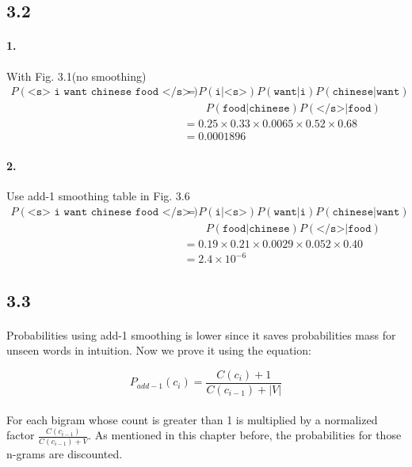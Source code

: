 \documentclass{article}
\begin{document}
\subsection*{3.2}
\paragraph{1.}
With Fig. 3.1(no smoothing)
\begin{align*}
    P(\texttt{<s> i want chinese food </s>})
     & = P(\texttt{i|<s>}) P(\texttt{want|i}) P(\texttt{chinese|want}) \\
     & \qquad P(\texttt{food|chinese}) P(\texttt{</s>|food})           \\
     & = 0.25 \times 0.33 \times 0.0065 \times 0.52 \times 0.68        \\
     & = 0.0001896
\end{align*}

\paragraph{2.}
Use add-1 smoothing table in Fig. 3.6
\begin{align*}
    P(\texttt{<s> i want chinese food </s>})
     & = P(\texttt{i|<s>}) P(\texttt{want|i})P(\texttt{chinese|want}) \\
     & \qquad P(\texttt{food|chinese}) P(\texttt{</s>|food})          \\
     & = 0.19 \times 0.21 \times 0.0029 \times 0.052 \times 0.40      \\
     & = 2.4 \times 10^{-6}
\end{align*}

\subsection*{3.3}
\paragraph{}
Probabilities using add-1 smoothing is lower since it saves probabilities
mass for unseen words in intuition. Now we prove it using the equation:

$$P_{add-1}(c_i) = \displaystyle\frac{C(c_i) + 1}{C(c_{i-1}) + |V|}$$

\paragraph{}
For each bigram whose count is greater than 1
is multiplied by a normalized factor $\displaystyle\frac{C(c_{i-1})}{C(c_{i-1}) + V}$.
As mentioned in this chapter before, the probabilities for those n-grams are discounted.
\end{document}
